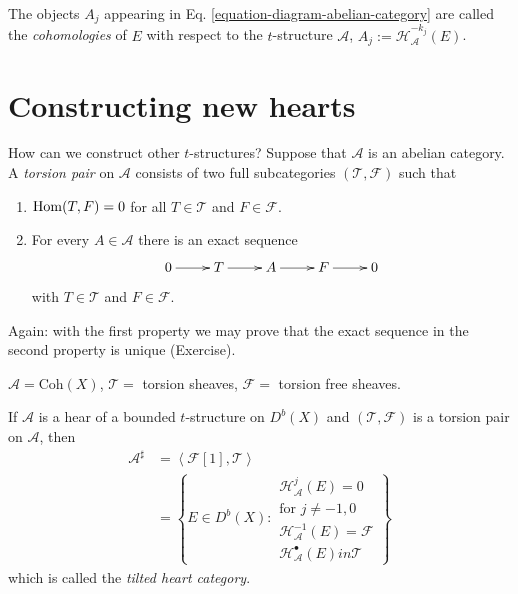 \begin{definition}
\label{definition-cohomologies}
The objects $A_j$ appearing in Eq.
\ref{equation-diagram-abelian-category} are
called the {\it cohomologies} of $E$ with
respect to the $t$-structure $\mathcal{A}$,
$A_j:=\mathcal{H}_{\mathcal{A}}^{-k_j}(E)$.
\end{definition}

\section{Constructing new hearts}
\label{section-constructing-new-heats}

How can we construct other $t$-structures?
Suppose that $\mathcal{A}$ is an abelian
category. A {\it torsion pair} on
$\mathcal{A}$ consists of two full
subcategories $(\mathcal{T}, \mathcal{F})$
such that
\begin{enumerate}
\item $\mathop{\mathrm{Hom}}\nolimits(T,F)=0$ for all $T \in
\mathcal{T}$ and $F \in \mathcal{F}$.
\item For every $A \in \mathcal{A}$ there is
an exact sequence
$$
\xymatrix{
0\ar[r]&T\ar[r]&A\ar[r]&F\ar[r]&0
}
$$
with $T \in \mathcal{T}$ and $F \in
\mathcal{F}$.
\end{enumerate}

Again: with the first property we may prove
that the exact sequence in the second
property is unique (Exercise).

\begin{exercise}
\label{exercise-torsion-pair}
$\mathcal{A}=\text{Coh}(X)$, $\mathcal{T}=$
torsion sheaves, $\mathcal{F}=$ torsion free
sheaves.
\end{exercise}

\begin{proposition}
\label{proposition-}
If $\mathcal{A}$ is a hear of a bounded
$t$-structure on $D^b(X)$ and
$(\mathcal{T},\mathcal{F})$ is a torsion pair
on $\mathcal{A}$, then
$$
\begin{aligned}
\mathcal{A}^\sharp&=\left\langle{}\mathcal{F}[1],
\mathcal{T}\right\rangle{}\\
&=\left\{E\in
D^b(X):\substack{\mathcal{H}_{\mathcal{A}}
^j(E)=0\\
\text{for $j \neq -1,0$} \\
\mathcal{H}_{\mathcal{A}}^{-1}(E)=\mathcal{F}
\\
\mathcal{H}_{\mathcal{A}}^\bullet(E) in
\mathcal{T} }\right\}
\end{aligned}
$$
which is called the {\it tilted heart
category}.
\end{proposition}


